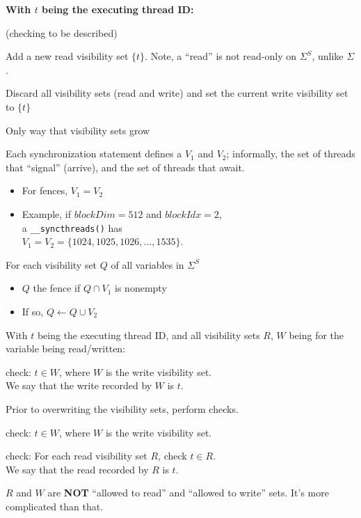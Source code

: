 \hfill
\begin{minipage}[t]{0.5\textwidth}\fixminipage
\textbf{With $t$ being the executing thread ID:}

 (checking to be described)

Add a new read visibility set $\{t\}$.
Note, a ``read'' is not read-only on $\Sigma^S$, unlike $\Sigma$.


Discard all visibility sets (read and write) and set the current write visibility set to $\{t\}$


Only way that visibility sets grow

Each synchronization statement defines a  $V_1$ and  $V_2$;
informally, the set of threads that ``signal'' (arrive), and the set of threads that await.
\begin{itemize}
  \item For fences, $V_1 = V_2$
  \item Example, if $blockDim=512$ and $blockIdx=2$,\\a \texttt{\_\_syncthreads()} has\\$V_1 = V_2 = \{1024, 1025, 1026, ... , 1535 \}$.
\end{itemize}

For each visibility set $Q$ of all variables in $\Sigma^S$
\begin{itemize}
  \item $Q$  the fence if $Q \cap V_1$ is nonempty
  \item If so, $Q \leftarrow Q \cup V_2$
\end{itemize}
\end{minipage}

\newpage
{}

\begin{minipage}[t]{0.7\textwidth}\fixminipage
With $t$ being the executing thread ID, and all visibility sets $R$, $W$ being for the variable being read/written:


 check: $t \in W$, where $W$ is the write visibility set.\\
We say that the write recorded by $W$ is  $t$.


Prior to overwriting the visibility sets, perform checks.

 check: $t \in W$, where $W$ is the write visibility set.

 check: For each read visibility set $R$, check $t \in R$.\\
We say that the read recorded by $R$ is  $t$.

\vspace{10mm}

 $R$ and $W$ are \textbf{NOT} ``allowed to read'' and ``allowed to write'' sets.
It's more complicated than that.
\end{minipage}

